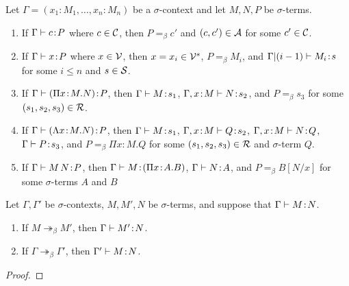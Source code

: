 \documentclass[reqno, twoside]{article}
\begin{document}
    \begin{lemma}\label{lem:stripping}
        Let $\Gamma=(x_1\!:\!M_1,\dots,x_n\!:\!M_n)$ be a $\sigma$-context and let $M,N,P$ be $\sigma$-terms.
        \begin{enumerate}
            \item If $\Gamma\vdash c\!:\!P$ where $c\in\mathcal{C}$, then $P=_\beta c'$ and $(c,c')\in\mathcal{A}$ for some $c'\in\mathcal{C}$.
                \vspace{-0.05in}
            \item If $\Gamma\vdash x\!:\!P$ where $x\in\mathcal{V}$, then $x=x_i\in\mathcal{V}^s$, $P=_\beta M_i$, and $\Gamma|(i-1)\vdash M_i\!:\!s$ for some $i\leq n$ and $s\in\mathcal{S}$.
                \vspace{-0.05in}
            \item If $\Gamma\vdash(\Pi x\!:\!M.N)\!:\!P$, then $\Gamma\vdash M\!:\!s_1$, $\Gamma,x\!:\!M\vdash N\!:\!s_2$, and $P=_\beta s_3$ for some $(s_1,s_2,s_3)\in\mathcal{R}$.
                \vspace{-0.05in}
            \item If $\Gamma\vdash(\Lambda x\!:\!M.N)\!:\!P$, then $\Gamma\vdash M\!:\!s_1$, $\Gamma,x\!:\!M\vdash Q\!:\!s_2$, $\Gamma,x\!:\!M\vdash N\!:\!Q$, $\Gamma\vdash P\!:\!s_3$, and $P=_\beta\Pi x\!:\! M.Q$ for some $(s_1,s_2,s_3)\in\mathcal{R}$ and $\sigma$-term $Q$.
                \vspace{-0.05in}
            \item If $\Gamma\vdash M\,N\!:\!P$, then $\Gamma\vdash M\!:\!(\Pi x\!:\!A.B)$, $\Gamma\vdash N\!:\!A$, and $P=_\beta B[N/x]$ for some $\sigma$-terms $A$ and $B$
        \end{enumerate}
    \end{lemma}

    \begin{theorem}
        Let $\Gamma,\Gamma'$ be $\sigma$-contexts, $M,M',N$ be $\sigma$-terms, and suppose that $\Gamma\vdash M\!:\!N$.
        \begin{enumerate}
            \item If $M\twoheadrightarrow_\beta M'$, then $\Gamma\vdash M'\!:\! N$.
                \vspace{-0.05in}
            \item If $\Gamma\twoheadrightarrow_\beta\Gamma'$, then $\Gamma'\vdash M\!:\! N$.
        \end{enumerate}
    \end{theorem}
    \begin{proof}
        \TODO
    \end{proof}
\end{document}

